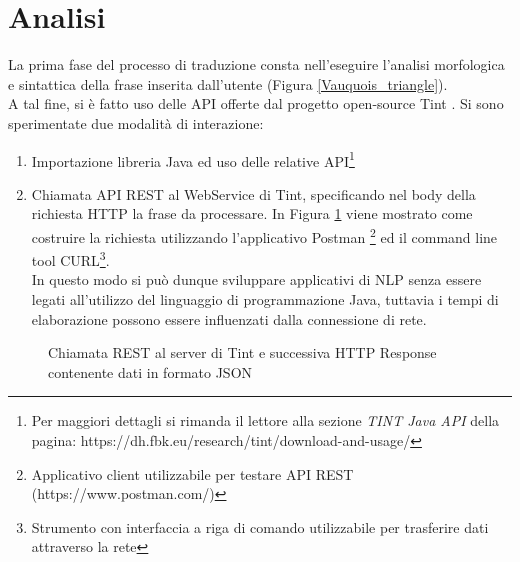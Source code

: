 \section{Analisi}
La prima fase del processo di traduzione consta nell'eseguire l'analisi morfologica e sintattica della frase inserita dall'utente (Figura \ref{Vauquois_triangle}). \\
A tal fine, si è fatto uso delle API offerte dal progetto open-source Tint \cite{tint_due}.
Si sono sperimentate due modalità di interazione:
\begin{enumerate}
	\item Importazione libreria Java ed uso delle relative API\footnote{Per maggiori dettagli si rimanda il lettore alla sezione \textit{TINT Java API }della pagina: https://dh.fbk.eu/research/tint/download-and-usage/}
		\item Chiamata API REST al WebService di Tint, specificando nel body della richiesta HTTP la frase da processare.
		In Figura \ref{REST} viene mostrato come costruire la richiesta utilizzando l'applicativo Postman \footnote{Applicativo client utilizzabile per testare API REST (https://www.postman.com/)} ed il command line tool CURL\footnote{Strumento con interfaccia a riga di comando utilizzabile per trasferire dati attraverso la rete}. \\
		In questo modo si può dunque sviluppare applicativi di NLP senza essere legati all'utilizzo del linguaggio di programmazione Java, tuttavia i tempi di elaborazione possono essere influenzati dalla connessione di rete.
\end{enumerate}
	\begin{figure}[!ht]
	\centering
	\par\medskip
	\caption{Chiamata REST al server di Tint e successiva HTTP Response contenente dati in formato JSON}
	\label{REST}
\end{figure}
